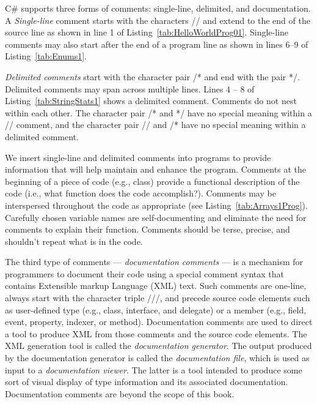C\# supports three forms of comments: single-line, delimited, and
documentation. A \emph{Single-line} comment starts with the
characters // and extend to the end of the source line as shown in
line 1 of Listing~\ref{tab:HelloWorldProg01}. Single-line comments
may also start after the end of a program line as shown in lines
6--9 of Listing~\ref{tab:Enums1}.

\emph{Delimited comments} start with the character pair /* and end
with the pair */. Delimited comments may span across multiple
lines. Lines 4 -- 8 of Listing~\ref{tab:StringStats1} shows a
delimited comment. Comments do not nest within each other. The
character pair /* and */ have no special meaning within a //
comment, and the character pair // and /* have no special meaning
within a delimited comment.


We insert single-line and delimited comments into programs to
provide information that will help maintain and enhance the
program. Comments at the beginning of a piece of code (e.g.,
class) provide a functional description of the code (i.e., what
function does the code accomplish?). Comments may be interspersed
throughout the code as appropriate (see
Listing~\ref{tab:Arrays1Prog}). Carefully chosen variable names
are self-documenting and eliminate the need for comments to
explain their function. Comments should be terse, precise, and
shouldn't repeat what is in the code.

The third type of comments --- \emph{documentation comments} ---
is a mechanism for programmers to document their code using a
special comment syntax that contains Extensible markup Language
(XML) text. Such comments are one-line, always start with the
character triple ///, and precede source code elements such as
user-defined type (e.g., class, interface, and delegate) or a
member (e.g., field, event, property, indexer, or method).
Documentation comments are used to direct a tool to produce XML
from those comments and the source code elements. The XML
generation tool is called the \emph{documentation generator}. The
output produced by the documentation generator is called the
\emph{documentation file}, which is used as input to a
\emph{documentation viewer}. The latter is a tool intended to
produce some sort of visual display of type information and its
associated documentation. Documentation comments are beyond the
scope of this book.


{\samepage\vspace{1ex}\noindent\usebox{\phicsep}\vspace{1.5ex}}
\vspace{-0.4in}
